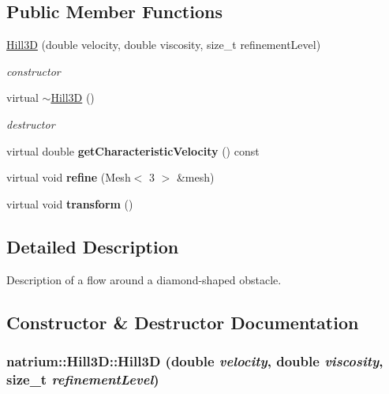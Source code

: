 \subsection*{Public Member Functions}
\begin{DoxyCompactItemize}
\item 
\hyperlink{classnatrium_1_1Hill3D_a3972f24e6e178a1a7aacf6561c5ac119}{Hill3D} (double velocity, double viscosity, size\_\-t refinementLevel)
\begin{DoxyCompactList}\small\item\em constructor \item\end{DoxyCompactList}\item 
\hypertarget{classnatrium_1_1Hill3D_ae76da28f7d23a057b216a92681fc2fb5}{
virtual \hyperlink{classnatrium_1_1Hill3D_ae76da28f7d23a057b216a92681fc2fb5}{$\sim$Hill3D} ()}
\label{classnatrium_1_1Hill3D_ae76da28f7d23a057b216a92681fc2fb5}

\begin{DoxyCompactList}\small\item\em destructor \item\end{DoxyCompactList}\item 
\hypertarget{classnatrium_1_1Hill3D_abc17d07261926052b3197800b3b64461}{
virtual double {\bfseries getCharacteristicVelocity} () const }
\label{classnatrium_1_1Hill3D_abc17d07261926052b3197800b3b64461}

\item 
\hypertarget{classnatrium_1_1Hill3D_a1b5f79484ea6ce7f2a02e50bc146a420}{
virtual void {\bfseries refine} (Mesh$<$ 3 $>$ \&mesh)}
\label{classnatrium_1_1Hill3D_a1b5f79484ea6ce7f2a02e50bc146a420}

\item 
\hypertarget{classnatrium_1_1Hill3D_aaf0b795b00974c783a72648dc878865c}{
virtual void {\bfseries transform} ()}
\label{classnatrium_1_1Hill3D_aaf0b795b00974c783a72648dc878865c}

\end{DoxyCompactItemize}


\subsection{Detailed Description}
Description of a flow around a diamond-\/shaped obstacle. 

\subsection{Constructor \& Destructor Documentation}
\hypertarget{classnatrium_1_1Hill3D_a3972f24e6e178a1a7aacf6561c5ac119}{
\subsubsection[{Hill3D}]{\setlength{\rightskip}{0pt plus 5cm}natrium::Hill3D::Hill3D (double {\em velocity}, \/  double {\em viscosity}, \/  size\_\-t {\em refinementLevel})}}
\label{classnatrium_1_1Hill3D_a3972f24e6e178a1a7aacf6561c5ac119}


